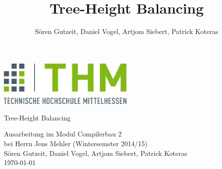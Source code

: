 \documentclass[12pt,a4paper,titlepage,oneside]{scrreprt}
\author{Sören Gutzeit, Daniel Vogel, Artjom Siebert, Patrick Koteras}
\title{Tree-Height Balancing}
\renewcommand{\baselinestretch}{1.50}\normalsize
\begin{document}
\begin{titlepage}
	\begin{center}
		\includegraphics[width=0.5\textwidth]{images/logo.png}\\
		\vspace{3cm}
		\begin{Huge}
			 Tree-Height Balancing
		\end{Huge} \linebreak
		Ausarbeitung im Modul Compilerbau 2 \\
		bei Herrn Jens Mehler (Wintersemster 2014/15)\\
		\vspace{3cm}
		Sören Gutzeit, Daniel Vogel, Artjom Siebert, Patrick Koteras \\
		\today
	\end{center}
\end{titlepage}

\newpage 
\thispagestyle{empty}
\quad
\newpage

\renewcommand{\baselinestretch}{1.30}\normalsize
{}
\setcounter{page}{1}
\tableofcontents
\renewcommand{\baselinestretch}{1.50}\normalsize

\setcounter{last_roman}{\value{page}}
\newpage



%


\newpage 
\thispagestyle{empty}
\quad
\newpage

\setcounter{page}{\value{last_roman}}

\newpage

\newpage

\newpage

\end{document}

